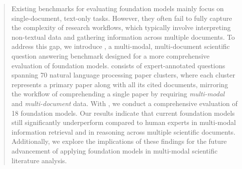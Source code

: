 \begin{abstract}
    
Existing benchmarks for evaluating foundation models mainly focus on single-document, text-only tasks.
%
However, they often fail to fully capture the complexity of research workflows, which typically involve interpreting non-textual data and gathering information across multiple documents.
%
To address this gap, we introduce \data, a multi-modal, multi-document scientific question answering benchmark designed for a more comprehensive evaluation of foundation models. 
%
\data consists of \datanum expert-annotated questions spanning 70 natural language processing paper clusters, where each cluster represents a primary paper along with all its cited documents, mirroring the workflow of comprehending a single paper by requiring \emph{multi-modal} and \emph{multi-document} data. 
%
With \data, we conduct a comprehensive evaluation of 18 foundation models. 
%
Our results indicate that current foundation models still significantly underperform compared to human experts in multi-modal information retrieval and in reasoning across multiple scientific documents. 
%
Additionally, we explore the implications of these findings for the future advancement of applying foundation models in multi-modal scientific literature analysis.

\end{abstract}